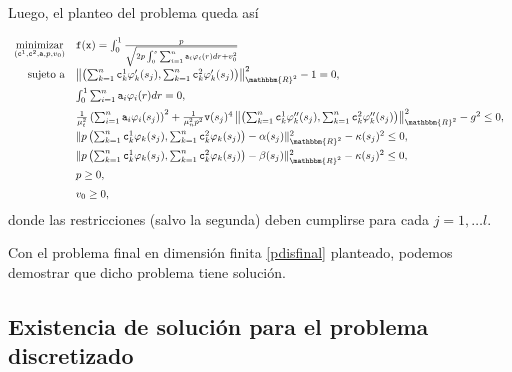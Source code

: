 \documentclass[a4paper,10pt]{book}
\newcommand{\R}{\mathbbm{R}}
\begin{document}
Luego, el planteo del problema queda así

\begin{equation}\label{pdisfinal}
\begin{array}{rl}
\displaystyle \mathop{\mathrm{minimizar}}_{(\texttt{c}^1,\texttt{c}^2,\texttt{a},p,v_0)} & \texttt{f}(\texttt{x})=\int_0^1\frac{p}{\sqrt{2p\int_0^s \sum_{i=1}^n\texttt{a}_i\varphi_i(r)dr +v_0^2}}\\
 \mathrm{sujeto \ a} & \left\|\left(\sum_{k=1}^n\texttt{c}^1_k\varphi'_k(s_j), \sum_{k=1}^n\texttt{c}^2_k\varphi'_k(s_j)\right)\right\|_{\R^2}^2-1=0,\\[2mm]
                     & \int_{0}^{1} \sum_{i=1}^n\texttt{a}_i\varphi_i(r)dr=0,\\[2mm]
                     & \frac{1}{\mu_t^2} \left(\sum_{i=1}^n\texttt{a}_i\varphi_i(s_j)\right)^2 + \frac{1}{\mu_n^2 p^2}\texttt{v}(s_j)^4\left\| \left(\sum_{k=1}^n\texttt{c}^1_k\varphi_k''(s_j), \sum_{k=1}^n\texttt{c}^2_k\varphi_k''(s_j)\right) \right\|_{\R^2}^2-g^2\leq 0,\,\\[2mm]
                     &  \|p\left(\sum_{k=1}^n\texttt{c}^1_k\varphi_k(s_j), \sum_{k=1}^n\texttt{c}^2_k\varphi_k(s_j)\right)-\alpha(s_j)\|_{\R^2}^2-\kappa(s_j)^2 \leq 0,\, \\[2mm]
                     &  \|p\left(\sum_{k=1}^n\texttt{c}^1_k\varphi_k(s_j), \sum_{k=1}^n\texttt{c}^2_k\varphi_k(s_j)\right)-\beta(s_j)\|_{\R^2}^2-\kappa(s_j)^2 \leq 0, \,\\[2mm]
                     & p\geq 0,\,\\[2mm]
                     & v_0\geq 0,

  \end{array}
\end{equation}
donde las restricciones (salvo la segunda) deben cumplirse para cada $j=1,\ldots l$.

Con el problema final en dimensión finita \eqref{pdisfinal} planteado, podemos demostrar que dicho problema tiene solución.

\subsection{Existencia de solución para el problema discretizado}\label{existsoldiscretizado}
\end{document}
